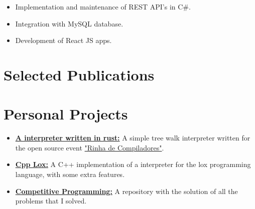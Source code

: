 \documentclass[11pt,a4paper,sans]{moderncv}        %
\begin{document}
\vspace{+1.0em}

\vspace{-1.5em}\begin{small}
    \begin{itemize}
\item Implementation and maintenance of REST API's in C\#.
\item Integration with MySQL database. 
\item Development of React JS apps. 
    \end{itemize}
\end{small}

\section{Selected Publications}

    
\section{Personal Projects}
\begin{itemize}
\setlength\itemsep{0.65em}
\item \href{https://github.com/RosaUlisses/Compilers-Rinha/tree/main/interpreter}{\textbf{A interpreter written in rust:}} A simple tree walk interpreter written for the open source event \href{https://github.com/aripiprazole/rinha-de-compiler}{"Rinha de Compiladores"}.  

\item \href{https://github.com/RosaUlisses/CppLox}{\textbf{Cpp Lox:}} A C++ implementation of a interpreter for the lox programming language, with some extra features.  

\item \href{https://github.com/RosaUlisses/Competitive-Programming}{\textbf{Competitive Programming:}} A repository with the solution of all the problems that I solved.

\end{itemize}
\end{document}
